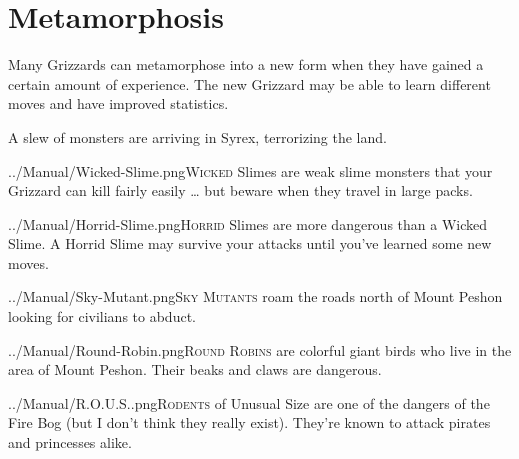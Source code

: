 \documentclass[10pt,twocolumn,openany,article]{memoir}
\begin{document}
\section{Metamorphosis}

Many Grizzards  can metamorphose into a  new form when they  have gained
a certain  amount of experience. The  new Grizzard may be  able to learn
different moves and have improved statistics.

\pagebreak
{}

A slew of monsters are arriving in Syrex, terrorizing the land.

\vspace{14pt}

\lettrine[image=true,                lines=5,               findent=3pt,
nindent=3pt]{../Manual/Wicked-Slime.png}{Wicked}  Slimes are  weak slime
monsters that  your Grizzard can  kill fairly  easily … but  beware when
they travel in large packs.

\vspace{14pt}

\lettrine[image=true,                lines=5,               findent=3pt,
nindent=3pt]{../Manual/Horrid-Slime.png}{Horrid}    Slimes   are    more
dangerous than a  Wicked Slime. A Horrid Slime may  survive your attacks
until you've learned some new moves.

\vspace{14pt}

\lettrine[image=true,                lines=5,               findent=3pt,
nindent=3pt]{../Manual/Sky-Mutant.png}{Sky Mutants} roam the roads north
of Mount Peshon  looking for civilians to abduct.

\vspace{14pt}

\lettrine[image=true,                lines=5,               findent=3pt,
nindent=3pt]{../Manual/Round-Robin.png}{Round Robins} are colorful giant
birds who live  in the area of  Mount Peshon. Their beaks  and claws are
dangerous.

\ifdefined\ATARIAGESAVE\pagebreak\else
\vspace{14pt}
\fi

\lettrine[image=true,                lines=5,               findent=3pt,
nindent=3pt]{../Manual/R.O.U.S..png}{Rodents} of Unusual Size are one of
the  dangers of  the Fire  Bog (but  I don't  think they  really exist).
They're known to attack pirates and princesses alike.
\end{document}
